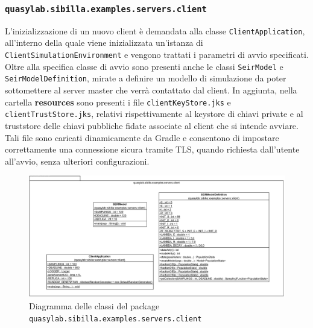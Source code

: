 \subsubsection{\texttt{quasylab.sibilla.examples.servers.client}}

L'inizializzazione di un nuovo client è demandata alla classe \texttt{ClientApplication}, all'interno della quale viene inizializzata un'istanza di \texttt{ClientSimulationEnvironment} e vengono trattati i parametri di avvio specificati.
Oltre alla specifica classe di avvio sono presenti anche le classi \texttt{SeirModel} e \texttt{SeirModelDefinition}, mirate a definire un modello di simulazione da poter sottomettere al server master che verrà contattato dal client.
In aggiunta, nella cartella \textbf{resources} sono presenti i file \texttt{clientKeyStore.jks} e \texttt{clientTrustStore.jks}, relativi rispettivamente al keystore di chiavi private e al truststore delle chiavi pubbliche fidate associate al client che si intende avviare. Tali file sono caricati dinamicamente da Gradle e consentono di impostare correttamente una connessione sicura tramite TLS, quando richiesta dall'utente all'avvio, senza ulteriori configurazioni.

\begin{figure}[H]
    \includegraphics[width=\linewidth]{images/quasylab.sibilla.examples.servers.client.png}
    \captionsetup{justification=centering}
    \caption{Diagramma delle classi del package \texttt{quasylab.sibilla.examples.servers.client}}
  \end{figure}


